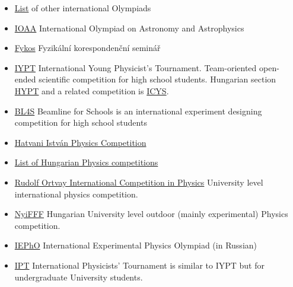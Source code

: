 \documentclass{article}
\begin{document}
\begin{itemize}
\begin{itemize}
\item \href{http://eik.bme.hu/~vanko/fizika/olimpia.htm}{List} of other international Olympiads

\item \href{http://www.ioaastrophysics.org/}{IOAA} International Olympiad on Astronomy and Astrophysics

\item \href{https://fykos.org/en}{Fykos} Fyzikální korespondenční seminář


\item \href{https://www.iypt.org/}{IYPT} International Young Physicist's Tournament. Team-oriented open-ended scientific competition for high school students. Hungarian section \href{http://hypt.elte.hu/}{HYPT} and a related competition is \href{http://metal.elte.hu/~icys/}{ICYS}.

\item \href{https://beamlineforschools.cern/home}{BL4S} Beamline for Schools is an international experiment designing competition for high school students

\item \href{http://hatvaniverseny.unideb.hu/}{Hatvani István Physics Competition}

\item \href{http://web.archive.org/web/20200318012748/http://fizika.fazekas.hu/index.php/2019/10/01/201920-as-tanev-versenyei-fizikabol/}{List of Hungarian Physics competitions}

\item \href{https://ortvay.elte.hu/main.html}{Rudolf Ortvay International Competition in Physics} University level international physics competition.


\item \href{http://nyifff.elte.hu/}{NyiFFF} Hungarian University level outdoor (mainly experimental) Physics competition.

\item \href{http://iepho.ru/}{IEPhO} International Experimental Physics Olympiad (in Russian)

\item \href{https://iptnet.info/}{IPT} International Physicists' Tournament is similar to IYPT but for undergraduate University students.
\end{itemize}


\end{itemize}
\end{document}
